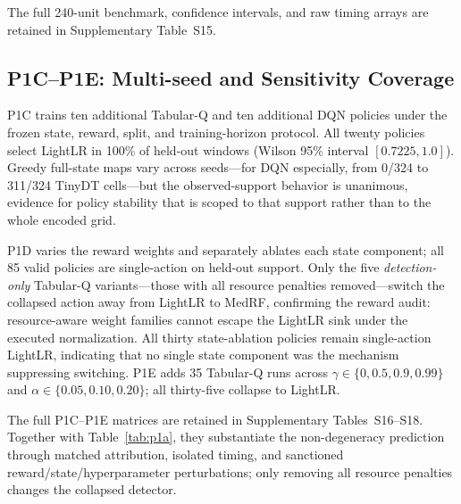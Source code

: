 The full 240-unit benchmark, confidence intervals, and raw timing arrays are retained in Supplementary Table~S15.

\subsection{P1C--P1E: Multi-seed and Sensitivity Coverage}
P1C trains ten additional Tabular-Q and ten additional DQN policies under the frozen state, reward, split, and training-horizon protocol. All twenty policies select LightLR in 100\% of held-out windows (Wilson 95\% interval $[0.7225, 1.0]$). Greedy full-state maps vary across seeds---for DQN especially, from 0/324 to 311/324 TinyDT cells---but the observed-support behavior is unanimous, evidence for policy stability that is scoped to that support rather than to the whole encoded grid.

P1D varies the reward weights and separately ablates each state component; all 85 valid policies are single-action on held-out support. Only the five \emph{detection-only} Tabular-Q variants---those with all resource penalties removed---switch the collapsed action away from LightLR to MedRF, confirming the reward audit: resource-aware weight families cannot escape the LightLR sink under the executed normalization. All thirty state-ablation policies remain single-action LightLR, indicating that no single state component was the mechanism suppressing switching. P1E adds 35 Tabular-Q runs across $\gamma\in\{0,0.5,0.9,0.99\}$ and $\alpha\in\{0.05,0.10,0.20\}$; all thirty-five collapse to LightLR.

The full P1C--P1E matrices are retained in Supplementary Tables~S16--S18. Together with Table~\ref{tab:p1a}, they substantiate the non-degeneracy prediction through matched attribution, isolated timing, and sanctioned reward/state/hyperparameter perturbations; only removing all resource penalties changes the collapsed detector.
